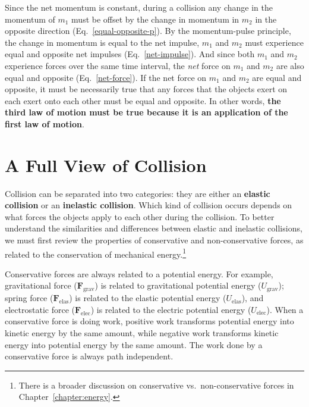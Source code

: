 Since the net momentum is constant, during a collision any change in the
momentum of $m_1$ must be offset by the change in momentum in $m_2$ in the
opposite direction (Eq.~\ref{equal-opposite-p}). By the momentum-pulse
principle, the change in momentum is equal to the net impulse, $m_1$ and $m_2$
must experience equal and opposite net impulses (Eq.~\ref{net-impulse}). And
since both $m_1$ and $m_2$ experience forces over the same time interval, the
\emph{net} force on $m_1$ and $m_2$ are also equal and opposite
(Eq.~\ref{net-force}). If the net force on $m_1$ and $m_2$ are equal and
opposite, it must be necessarily true that any forces that the objects exert on
each exert onto each other must be equal and opposite. In other words,
\textbf{the third law of motion must be true because it is an application of
  the first law of motion}.




\section{A Full View of Collision}

Collision can be separated into two categories: they are either an
\textbf{elastic collision} or an \textbf{inelastic collision}. Which kind of
collision occurs depends on what forces the objects apply to each other during
the collision. To better understand the similarities and differences between
elastic and inelastic collisions, we must first review the properties of
conservative and non-conservative forces, as related to the conservation of
mechanical energy.\footnote{There is a broader discussion on conservative vs.\
non-conservative forces in Chapter~\ref{chapter:energy}.}

Conservative forces are always related to a potential energy. For example,
gravitational force ($\bm F_\text{grav}$) is related to gravitational potential
energy ($U_\text{grav}$); spring force ($\bm F_\text{elas}$) is related to the
elastic potential energy ($U_\text{elas}$), and electrostatic force
($\bm F_\text{elec}$) is related to the electric potential energy
($U_\text{elec}$). When a conservative force is doing work, positive work
transforms potential energy into kinetic energy by the same amount, while
negative work transforms kinetic energy into potential energy by the same
amount. The work done by a conservative force is always path independent.

